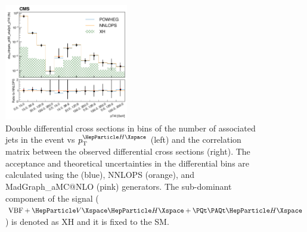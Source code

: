 \begin{center}
	\begin{figure}[!htb]
		\centering
		\includegraphics[width=0.48\textwidth]{Images/H4L/doublediff/plot_njets_pt30_eta2p5_pT4l.png}
		\caption{
			Double differential cross sections in bins of the number of associated jets in the event vs $\pt^{\PH}$ (left) and the correlation matrix between the observed differential cross sections (right).
			The acceptance and theoretical uncertainties in the differential bins are calculated using the \POWHEG (blue), NNLOPS (orange), and MadGraph\_aMC@NLO (pink) generators.
			The sub-dominant component of the signal ($\VBF + \VH + \ttH$) is denoted as XH and it is fixed to the SM.
			\label{fig:fidNJPTH}}
	\end{figure}
\end{center}

\clearpage

